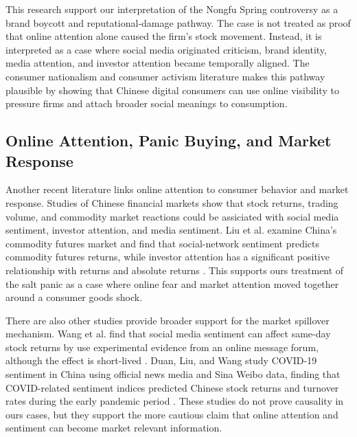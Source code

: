 \documentclass[conference]{IEEEtran}
\begin{document}
This research support our interpretation of the Nongfu Spring controversy as a brand boycott and reputational-damage pathway. The case is not treated as proof that online attention alone caused the firm's stock movement. Instead, it is interpreted as a case where social media originated criticism, brand identity, media attention, and investor attention became temporally aligned. The consumer nationalism and consumer activism literature makes this pathway plausible by showing that Chinese digital consumers can use online visibility to pressure firms and attach broader social meanings to consumption.

\subsection{Online Attention, Panic Buying, and Market Response}

Another recent literature links online attention to consumer behavior and market response. Studies of Chinese financial markets show that stock returns, trading volume, and commodity market reactions could be assiciated with social media sentiment, investor attention, and media sentiment. Liu et al. examine China's commodity futures market and find that social-network sentiment predicts commodity futures returns, while investor attention has a significant positive relationship with returns and absolute returns \cite{liu2023commodity}. This supports ours treatment of the salt panic as a case where online fear and market attention moved together around a consumer goods shock.

There are also other studies provide broader support for the market spillover mechanism. Wang et al. find that social media sentiment can affect same-day stock returns by use experimental evidence from an online message forum, although the effect is short-lived \cite{wang2022sentiment}. Duan, Liu, and Wang study COVID-19 sentiment in China using official news media and Sina Weibo data, finding that COVID-related sentiment indices predicted Chinese stock returns and turnover rates during the early pandemic period \cite{duan2021covid}. These studies do not prove causality in ours cases, but they support the more cautious claim that online attention and sentiment can become market relevant information.
\end{document}

